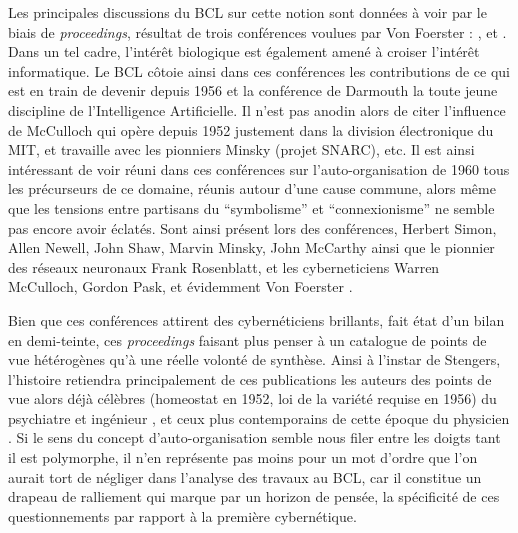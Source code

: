 Les principales discussions du BCL sur cette notion sont données à voir par le biais de \textit{proceedings}, résultat de trois conférences voulues par Von Foerster : \autocite{Yovits1960}, \autocite{Yovits1962} et \autocite{Foerster1962}. Dans un tel cadre, l'intérêt biologique est également amené à croiser l'intérêt informatique. Le BCL côtoie ainsi dans ces conférences les contributions de ce qui est en train de devenir depuis 1956 et la conférence de Darmouth la toute jeune discipline de l'Intelligence Artificielle. Il n'est pas anodin alors de citer l'influence de McCulloch qui opère depuis 1952 justement dans la division électronique du MIT, et travaille avec les pionniers Minsky (projet SNARC), etc. Il est ainsi intéressant de voir réuni dans ces conférences sur l'auto-organisation de 1960 tous les précurseurs de ce domaine, réunis autour d'une cause commune, alors même que les tensions entre partisans du \enquote{symbolisme} et \enquote {connexionisme} ne semble pas encore avoir éclatés. Sont ainsi présent lors des conférences, Herbert Simon, Allen Newell, John Shaw, Marvin Minsky, John McCarthy ainsi que le pionnier des réseaux neuronaux Frank Rosenblatt, et les cyberneticiens Warren McCulloch, Gordon Pask, et évidemment Von Foerster \autocites[256]{Asaro2007}{Yovits1960}.

Bien que ces conférences attirent des cybernéticiens brillants, \textcite[87]{Stengers1985} fait état d'un bilan en demi-teinte, ces \textit{proceedings} faisant plus penser à un catalogue de points de vue hétérogènes qu'à une réelle volonté de synthèse. Ainsi à l'instar de Stengers, l'histoire retiendra principalement de ces publications les auteurs des points de vue alors déjà célèbres (homeostat en 1952, loi de la variété requise en 1956) du psychiatre et ingénieur \autocites{Ashby1947, Ashby1962}, et ceux plus contemporains de cette époque du physicien \textcite{Foerster1959} \autocites{Muller2007a}[55-56]{Stengers1985}. Si le sens du concept d'auto-organisation semble nous filer entre les doigts tant il est polymorphe, il n'en représente pas moins pour \textcite[106-110]{Livet1985} un mot d'ordre que l'on aurait tort de négliger dans l'analyse des travaux au BCL, car il constitue un drapeau de ralliement qui marque par un horizon de pensée, la spécificité de ces questionnements par rapport à la première cybernétique.

